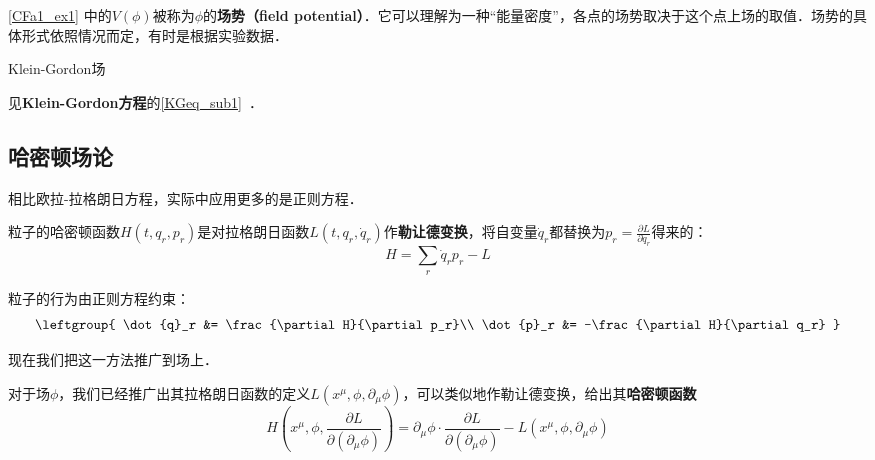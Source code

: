 \autoref{CFa1_ex1} 中的$V(\phi)$被称为$\phi$的\textbf{场势（field potential）}．它可以理解为一种“能量密度”，各点的场势取决于这个点上场的取值．场势的具体形式依照情况而定，有时是根据实验数据．



\begin{example}{Klein-Gordon场}

见\textbf{Klein-Gordon方程}的\autoref{KGeq_sub1}~．

\end{example}




\subsection{哈密顿场论}


相比欧拉-拉格朗日方程，实际中应用更多的是正则方程．

粒子的哈密顿函数$H(t, q_r, p_r)$是对拉格朗日函数$L(t, q_r, \dot{q}_r)$作\textbf{勒让德变换}，将自变量$\dot{q}_r$都替换为$p_r=\frac{\partial L}{\partial \dot{q}_r}$得来的：
\begin{equation}
H = \sum_r \dot{q}_rp_r-L
\end{equation}

粒子的行为由正则方程约束：
\begin{equation}
\leftgroup{
    \dot{q}_r &= \frac{\partial H}{\partial p_r}\\
    \dot{p}_r &= -\frac{\partial H}{\partial q_r}
}
\end{equation}

现在我们把这一方法推广到场上．

对于场$\phi$，我们已经推广出其拉格朗日函数的定义$L(x^\mu, \phi, \partial_\mu\phi)$，可以类似地作勒让德变换，给出其\textbf{哈密顿函数}
\begin{equation}
H(x^\mu, \phi, \frac{\partial L}{\partial (\partial_\mu\phi)}) = \partial_\mu\phi\cdot\frac{\partial L}{\partial (\partial_\mu\phi)}-L(x^\mu, \phi, \partial_\mu\phi)
\end{equation}























